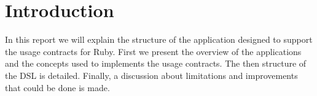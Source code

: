\section{Introduction}
In this report we will explain the structure of the application designed to support the usage contracts for Ruby. First we present the overview of the applications and the concepts used to implements the usage contracts. The then structure of the DSL is detailed. Finally, a discussion about limitations and improvements that could be done is made.